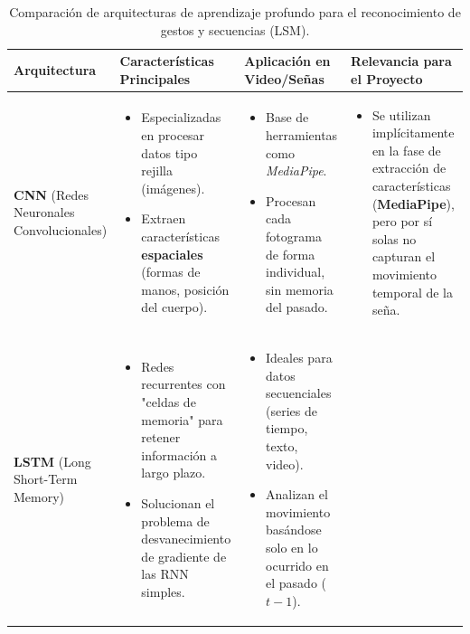 \begin{table}[H]
    \centering
    \caption{Comparación de arquitecturas de aprendizaje profundo para el reconocimiento de gestos y secuencias (LSM).}
    \label{tabla_comparativa_algoritmos}
    \begin{tabular}{|p{2.5cm}|p{4.5cm}|p{4.5cm}|p{4.5cm}|}
        \hline
        \textbf{Arquitectura} & \textbf{Características Principales} & \textbf{Aplicación en Video/Señas} & \textbf{Relevancia para el Proyecto} \\
        \hline
        \textbf{CNN} \newline (Redes Neuronales Convolucionales) &
        \begin{itemize}
            \item Especializadas en procesar datos tipo rejilla (imágenes).
            \item Extraen características \textbf{espaciales} (formas de manos, posición del cuerpo).
        \end{itemize} &
        \begin{itemize}
            \item Base de herramientas como \textit{MediaPipe}.
            \item Procesan cada fotograma de forma individual, sin memoria del pasado.
        \end{itemize} &
        \begin{itemize}
            \item Se utilizan implícitamente en la fase de extracción de características (\textbf{MediaPipe}), pero por sí solas no capturan el movimiento temporal de la seña.
        \end{itemize} \\
        \hline
        \textbf{LSTM} \newline (Long Short-Term Memory) &
        \begin{itemize}
            \item Redes recurrentes con "celdas de memoria" para retener información a largo plazo.
            \item Solucionan el problema de desvanecimiento de gradiente de las RNN simples.
        \end{itemize} &
        \begin{itemize}
            \item Ideales para datos secuenciales (series de tiempo, texto, video).
            \item Analizan el movimiento basándose solo en lo ocurrido en el pasado ($t-1$).

\end{itemize}
\end{tabular}
\end{table}
